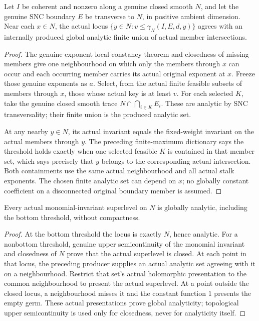 \begin{lemma}
\label{hir:monomial-superlevel-local-analytic-dictionary}
\leanok
Let $I$ be coherent and nonzero along a genuine closed smooth $N$, and
let the genuine SNC boundary $E$ be transverse to $N$, in positive
ambient dimension. Near each $x\in N$, the actual locus
$\{y\in N:v\le\gamma_N(I,E,d,y)\}$ agrees with an internally produced
global analytic finite union of actual member intersections.
\end{lemma}
\begin{proof}
The genuine exponent local-constancy theorem and closedness of missing
members give one neighbourhood on which only the members through $x$
can occur and each occurring member carries its actual original exponent
at $x$. Freeze those genuine exponents as $a$. Select, from the actual
finite feasible subsets of members through $x$, those whose actual key
is at least $v$. For each selected $K$, take the genuine closed smooth
trace $N\cap\bigcap_{i\in K}E_i$. These are analytic by SNC transversality;
their finite union is the produced analytic set.

At any nearby $y\in N$, its actual invariant equals the fixed-weight
invariant on the actual members through $y$. The preceding finite-maximum
dictionary says the threshold holds exactly when one selected feasible
$K$ is contained in that member set, which says precisely that $y$
belongs to the corresponding actual intersection. Both containments
use the same actual neighbourhood and all actual stalk exponents.
The chosen finite analytic set can depend on $x$; no globally constant
coefficient on a disconnected original boundary member is assumed.
\end{proof}

\begin{theorem}
\label{hir:monomial-superlevels-global-analytic}
\leanok
Every actual monomial-invariant superlevel on $N$ is globally analytic,
including the bottom threshold, without compactness.
\end{theorem}
\begin{proof}
At the bottom threshold the locus is exactly $N$, hence analytic.
For a nonbottom threshold, genuine upper semicontinuity of the monomial
invariant and closedness of $N$ prove that the actual superlevel is closed.
At each point in that locus, the preceding producer supplies an actual
analytic set agreeing with it on a neighbourhood. Restrict that set's
actual holomorphic presentation to the common neighbourhood to present
the actual superlevel. At a point outside the closed locus, a neighbourhood
misses it and the constant function $1$ presents the empty germ. These
actual presentations prove global analyticity; topological upper
semicontinuity is used only for closedness, never for analyticity itself.
\end{proof}

